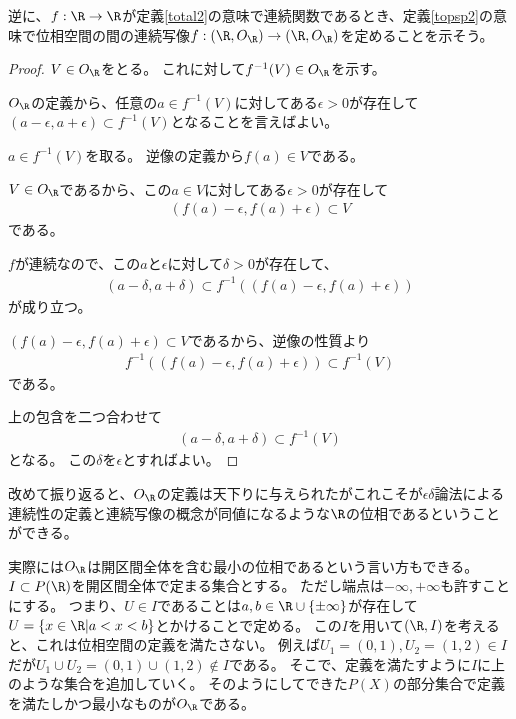 \documentclass[uplatex]{jsarticle}
\begin{document}
逆に、$f:\R\to\R$が定義\ref{total2}の意味で連続関数であるとき、定義\ref{topsp2}の意味で位相空間の間の連続写像$f:(\R,O_\R)\to(\R,O_\R)$を定めることを示そう。

\begin{proof}
  $V\in O_\R$をとる。
  これに対して$f^{-1}(V)\in O_\R$を示す。
  
  $O_\R$の定義から、任意の$a\in f^{-1}(V)$に対してある$\epsilon>0$が存在して$(a-\epsilon,a+\epsilon)\subset f^{-1}(V)$となることを言えばよい。
  
  $a\in f^{-1}(V)$を取る。
  逆像の定義から$f(a)\in V$である。
  
  $V\in O_\R$であるから、この$a\in V$に対してある$\epsilon>0$が存在して
  \begin{align*}
    (f(a)-\epsilon,f(a)+\epsilon)\subset V
  \end{align*}
  である。
  
  $f$が連続なので、この$a$と$\epsilon$に対して$\delta>0$が存在して、
  \begin{align*}
    (a-\delta,a+\delta)\subset f^{-1}((f(a)-\epsilon,f(a)+\epsilon))
  \end{align*}
  が成り立つ。

  $(f(a)-\epsilon,f(a)+\epsilon)\subset V$であるから、逆像の性質より
  \begin{align*}
    f^{-1}((f(a)-\epsilon,f(a)+\epsilon))\subset f^{-1}(V)
  \end{align*}
  である。
  
  上の包含を二つ合わせて
  \begin{align*}
    (a-\delta,a+\delta)\subset f^{-1}(V)
  \end{align*}
  となる。
  この$\delta$を$\epsilon$とすればよい。
\end{proof}

改めて振り返ると、$O_\R$の定義は天下りに与えられたがこれこそが$\epsilon\delta$論法による連続性の定義と連続写像の概念が同値になるような$\R$の位相であるということができる。

実際には$O_\R$は開区間全体を含む最小の位相であるという言い方もできる。
$I\subset P(\R)$を開区間全体で定まる集合とする。
ただし端点は$-\infty, +\infty$も許すことにする。
つまり、$U\in I$であることは$a,b\in\R\cup\{\pm\infty\}$が存在して$U=\{x\in\R\vert a<x<b\}$とかけることで定める。
この$I$を用いて$(\R,I)$を考えると、これは位相空間の定義を満たさない。
例えば$U_1=(0,1), U_2=(1,2)\in I$だが$U_1\cup U_2=(0,1)\cup(1,2)\notin I$である。
そこで、定義を満たすように$I$に上のような集合を追加していく。
そのようにしてできた$P(X)$の部分集合で定義を満たしかつ最小なものが$O_\R$である。
\end{document}
